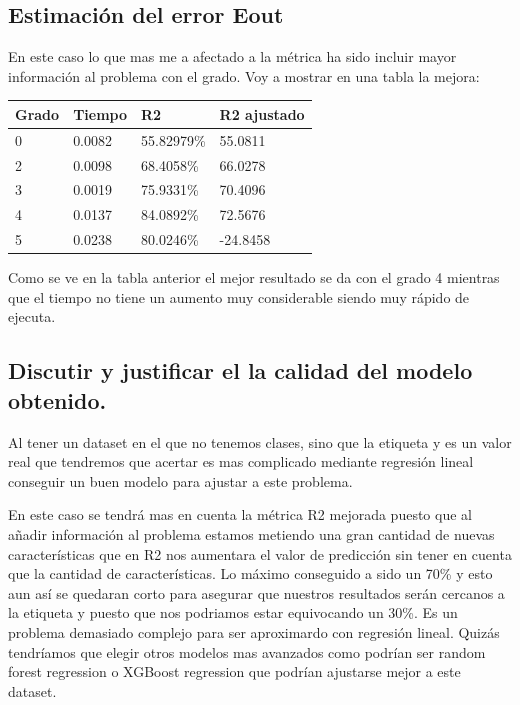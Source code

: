 \documentclass[titlepage]{article}
\begin{document}
\subsection{Estimación del error Eout}
En este caso lo que mas me a afectado a la métrica ha sido incluir mayor información al problema con el grado. Voy a mostrar en una tabla la mejora:
\begin{table}[H]
	\begin{center}
		\begin{tabular}{|l|l|l|l|}
			\hline
			Grado & Tiempo & R2& R2 ajustado\\
			\hline
			0 &  0.0082 & 55.82979\% &55.0811\\ 
			\hline
			2 &0.0098 & 68.4058\% & 66.0278\\  
			\hline
			3  & 0.0019 &  75.9331\% & 70.4096\\  
			\hline
			4  & 0.0137 & 84.0892\% & 72.5676\\  
			\hline
			5  & 0.0238 & 80.0246\% & -24.8458\\  
			\hline
		\end{tabular}
	\end{center}
Como se ve en la tabla anterior el mejor resultado se da con el grado 4 mientras que el tiempo no tiene un aumento muy considerable siendo muy rápido de ejecuta.
\subsection{Discutir y justificar el la calidad del modelo obtenido.}
Al tener un dataset en el que no tenemos clases, sino que la etiqueta y es un valor real que tendremos que acertar es mas complicado mediante regresión lineal conseguir un buen modelo para ajustar a este problema. 

En este caso se tendrá mas en cuenta la métrica R2 mejorada puesto que al añadir información al problema estamos metiendo una gran cantidad de nuevas características que en R2 nos aumentara el valor de predicción sin tener en cuenta que la cantidad de características.
Lo máximo conseguido a sido un 70\% y esto aun así se quedaran corto para asegurar que nuestros resultados serán cercanos a la etiqueta y puesto que nos podriamos estar equivocando un 30\%. Es un problema demasiado complejo para ser aproximardo con regresión lineal. Quizás tendríamos que elegir otros modelos mas avanzados como podrían ser random forest regression o XGBoost regression que podrían ajustarse mejor a este dataset.
\end{table}
\end{document}
